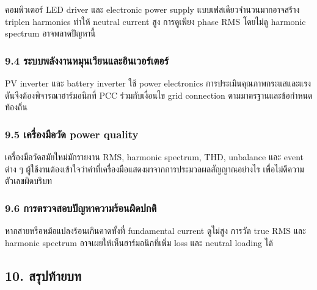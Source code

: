 คอมพิวเตอร์ LED driver และ electronic power supply แบบเฟสเดียวจำนวนมากอาจสร้าง triplen harmonics ทำให้ neutral current สูง การดูเพียง phase RMS โดยไม่ดู harmonic spectrum อาจพลาดปัญหานี้

\subsubsection{9.4 ระบบพลังงานหมุนเวียนและอินเวอร์เตอร์}

PV inverter และ battery inverter ใช้ power electronics การประเมินคุณภาพกระแสและแรงดันจึงต้องพิจารณาฮาร์มอนิกที่ PCC ร่วมกับเงื่อนไข grid connection ตามมาตรฐานและข้อกำหนดท้องถิ่น

\subsubsection{9.5 เครื่องมือวัด power quality}

เครื่องมือวัดสมัยใหม่มักรายงาน RMS, harmonic spectrum, THD, unbalance และ event ต่าง ๆ ผู้ใช้งานต้องเข้าใจว่าค่าที่เครื่องมือแสดงมาจากการประมวลผลสัญญาณอย่างไร เพื่อไม่ตีความตัวเลขผิดบริบท

\subsubsection{9.6 การตรวจสอบปัญหาความร้อนผิดปกติ}

หากสายหรือหม้อแปลงร้อนเกินคาดทั้งที่ fundamental current ดูไม่สูง การวัด true RMS และ harmonic spectrum อาจเผยให้เห็นฮาร์มอนิกที่เพิ่ม loss และ neutral loading ได้



\subsection{10. สรุปท้ายบท}

